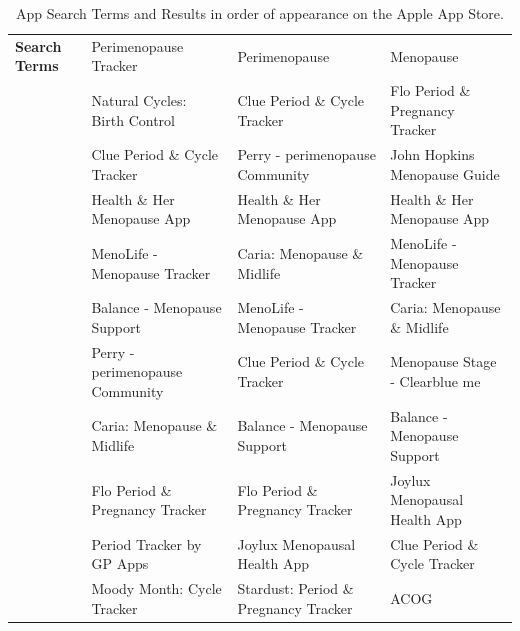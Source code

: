 \begin{table}[h!!]
    \begin{center}
      \caption{App Search Terms and Results in order of appearance on the Apple App Store.}
        \label{table:comparison-operators}
            \begin{tabular}{llll}
            \textbf{Search Terms} & Perimenopause Tracker           & Perimenopause                         & Menopause                       \\ \cline{2-4} 
                                  & Natural Cycles: Birth Control   & Clue Period \& Cycle Tracker          & Flo Period \& Pregnancy Tracker \\
                                  & Clue Period \& Cycle Tracker    & Perry - perimenopause Community       & John Hopkins Menopause Guide    \\
                                  & Health \& Her Menopause App     & Health \& Her Menopause App           & Health \& Her Menopause App     \\
                                  & MenoLife - Menopause Tracker    & Caria: Menopause \& Midlife           & MenoLife - Menopause Tracker    \\
                                  & Balance - Menopause Support     & MenoLife - Menopause Tracker          & Caria: Menopause \& Midlife     \\
                                  & Perry - perimenopause Community & Clue Period \& Cycle Tracker          & Menopause Stage - Clearblue me  \\
                                  & Caria: Menopause \& Midlife     & Balance - Menopause Support           & Balance - Menopause Support     \\
                                  & Flo Period \& Pregnancy Tracker & Flo Period \& Pregnancy Tracker       & Joylux Menopausal Health App    \\
                                  & Period Tracker by GP Apps       & Joylux Menopausal Health App          & Clue Period \& Cycle Tracker    \\
                                  & Moody Month: Cycle Tracker      & Stardust: Period \& Pregnancy Tracker & ACOG                           
            \end{tabular}
    \end{center}
  \end{table}